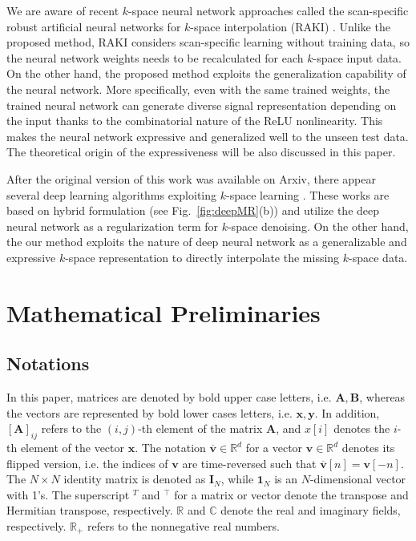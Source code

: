 \documentclass[10pt,journal]{IEEEtran}
\newcommand{\Ab}{{\mathbf A}}
\newcommand{\Bb}{{\mathbf B}}
\newcommand{\Ib}{{\mathbf I}}
\newcommand{\vb}{{\mathbf v}}
\newcommand{\xb}{{\mathbf x}}
\newcommand{\yb}{{\mathbf y}}
\newcommand{\Rd}{{\mathbb R}}
\newcommand{\Cd}{{\mathbb C}}
\newcommand{\0}{{\boldsymbol{0}}}
\newcommand{\oneb}{\boldsymbol{1}}
\begin{document}
We are aware of recent $k$-space neural network approaches called the scan-specific robust artificial neural networks for $k$-space interpolation (RAKI)
\cite{akccakaya2019scan}. Unlike the proposed method, RAKI considers scan-specific learning without training data, so the neural network weights needs to 
be recalculated for each $k$-space input data. On the other hand, the proposed method exploits the generalization capability of the neural network.  More specifically, even with the same trained weights, the trained neural network can generate diverse signal representation depending on the input  thanks to the combinatorial nature 
of the ReLU nonlinearity. This
 makes the neural network expressive and generalized well to the unseen test data. The theoretical origin of the expressiveness will be also discussed in this paper.

After the original version of this work was available on Arxiv,  there appear several  deep learning
algorithms exploiting $k$-space learning \cite{pramanik2018off,aggarwal2018multi}. These works are based on  hybrid formulation (see Fig.~\ref{fig:deepMR}(b))  and utilize the
deep neural network as a regularization term for $k$-space denoising. On the other hand,
 the our method
exploits the nature of  deep neural network as a generalizable and expressive $k$-space representation to directly
interpolate the missing $k$-space data.





\section{Mathematical Preliminaries}

\subsection{Notations}

In this paper, matrices are denoted by bold upper case letters, i.e. $\Ab,\Bb$, whereas
the vectors are represented by bold lower cases letters, i.e. $\xb,\yb$.
In addition, $[\Ab]_{ij}$ refers to the $(i,j)$-th element of the matrix $\Ab$, and $x[i]$ denotes the $i$-th element of the 
vector $\xb$.
The notation $\overline \vb\in \Rd^d$ for a vector $\vb\in \Rd^d$ denotes its flipped version, i.e. the indices of $\vb$ are time-reversed
such that $\overline\vb[n]=\vb[-n]$.
The $N\times N$ identity matrix is denoted as $\Ib_N$, while $\oneb_N$ is an $N$-dimensional vector
with 1's. 
The superscript $^T$ and $^\top$ for a matrix or vector denote
the transpose and Hermitian transpose, respectively.
$\Rd$ and $\Cd$ denote the real and imaginary fields, respectively.
$\Rd_+$ refers to the nonnegative real numbers.
\end{document}
